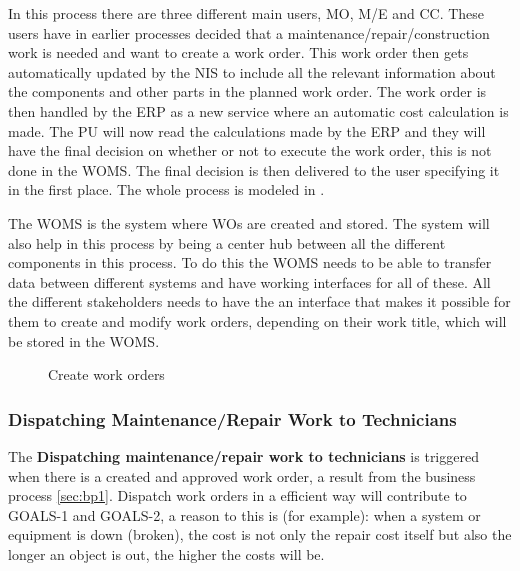 In this process there are three different main users, MO, M/E and CC. These users have in earlier processes decided that a maintenance/repair/construction work is needed and want to create a work order. This work order then gets automatically updated by the NIS to include all the relevant information about the components and other parts in the planned work order. The work order is then handled by the ERP as a new service where an automatic cost calculation is made. The PU will now read the calculations made by the ERP and they will have the final decision on whether or not to execute the work order, this is not done in the WOMS. The final decision is then delivered to the user specifying it in the first place. The whole process is modeled in .

The WOMS is the system where WOs are created and stored. The system will also help in this process by being a center hub between all the different components in this process. To do this the WOMS needs to be able to transfer data between different systems and have working interfaces for all of these. All the different stakeholders needs to have the an interface that makes it possible for them to create and modify work orders, depending on their work title, which will be stored in the WOMS.
\begin{figure}[H]
	\centering
	\setlength\fboxsep{7pt}
	\setlength\fboxrule{0.5pt}
	\caption{Create work orders}
	\label{fig:create}
\end{figure}
%
\subsubsection{Dispatching Maintenance/Repair Work to Technicians}
\label{sec:bp3}
The \textbf{Dispatching maintenance/repair work to technicians} is triggered when there is a created and approved work order, a result from the business process \ref{sec:bp1}. Dispatch work orders in a efficient way will contribute to GOALS-1 and GOALS-2, a reason to this is (for example): when a system or equipment is down (broken), the cost is not only the repair cost itself but also the longer an object is out, the higher the costs will be.

